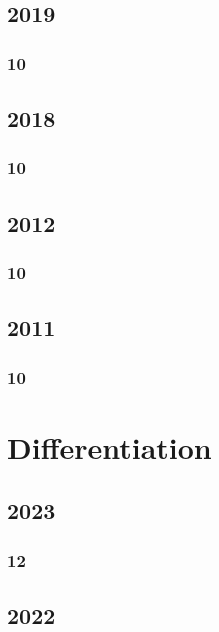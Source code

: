 \documentclass[11pt]{book}
\begin{document}
\section{2019}
\subsection{10}

\section{2018}
\subsection{10}

\section{2012}
\subsection{10}

\section{2011}
\subsection{10}

%


\chapter{Differentiation}
\section{2023}
\subsection{12}


\section{2022}
\end{document}
